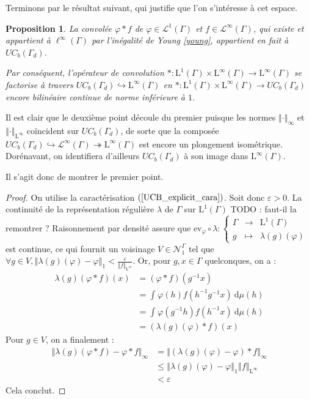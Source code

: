 \documentclass[a4paper,12pt]{article}
\newtheorem{proposition}[theorem]{Proposition}
\newcommand{\ev}{\mathrm{ev}}
\newcommand{\norm}[1]{\left\Vert #1\right\Vert}
\newcommand{\integral}[4]{\int_{#1}^{#2} #3~\mathrm{d}#4}
\newcommand\fundef[3]{#1: \left\{\begin{array}{ccc}#2\\#3\end{array}\right.}
\newcommand{\inv}{^{-1}}
\newcommand{\comp}{\circ}
\newcommand{\nhds}{\mathcal{N}}
\newcommand{\TODO}[1]{{\color{red}TODO :} #1}
\begin{document}
Terminons par le résultat suivant, qui justifie que l'on s'intéresse à cet espace.

\begin{proposition}\label{conv_UCB}
    La convolée $\varphi\ast f$ de $\varphi\in\mathscr{L}^1(\Gamma)$ et $f\in\mathscr{L}^\infty(\Gamma)$, qui existe et appartient à $\ell^\infty(\Gamma)$ par l'inégalité de Young \ref{young},
    appartient en fait à $UC_b(\Gamma_d)$.

    Par conséquent, l'opérateur de convolution $\ast:\mathrm{L}^1(\Gamma)\times\mathrm{L}^\infty(\Gamma)\to\mathrm{L}^\infty(\Gamma)$
    se factorise à travers $UC_b(\Gamma_d)\hookrightarrow\mathrm{L}^\infty(\Gamma)$ en 
    $\ast:\mathrm{L}^1(\Gamma)\times\mathrm{L}^\infty(\Gamma)\to UC_b(\Gamma_d)$ encore bilinéaire continue de norme inférieure à $1$.
\end{proposition}

Il est clair que le deuxième point découle du premier puisque les normes $\norm{\cdot}_\infty$ et $\norm{\cdot}_{\mathrm{L}^\infty}$ coïncident 
sur $UC_b(\Gamma_d)$, de sorte que la composée $UC_b(\Gamma_d)\hookrightarrow\mathscr{L}^\infty(\Gamma)\twoheadrightarrow\mathrm{L}^\infty(\Gamma)$
est encore un plongement isométrique. Dorénavant, on identifiera d'ailleurs $UC_b(\Gamma_d)$ à son image dans $\mathrm{L}^\infty(\Gamma)$.

Il s'agit donc de montrer le premier point.

\begin{proof}
    On utilise la caractérisation $(\ref{UCB_explicit_cara})$. Soit donc $\varepsilon>0$. La continuité de la représentation régulière $\lambda$ de $\Gamma$ sur $\mathrm{L}^1(\Gamma)$ \TODO{faut-il la remontrer ? Raisonnement par densité}
    assure que 
    $\fundef{\ev_\varphi\comp\lambda}{\Gamma&\to&\mathrm{L}^1(\Gamma)}{g&\mapsto&\lambda(g)(\varphi)}$ est continue, ce qui fournit 
    un voisinage $V\in\nhds_1^\Gamma$ tel que $\forall g\in V, \norm{\lambda(g)(\varphi) - \varphi}_1<\frac{\varepsilon}{\norm{f}_{\mathrm{L}^\infty}}$. Or, pour $g, x\in \Gamma$ quelconques, on a :
    \begin{align*}
        \lambda(g)(\varphi\ast f)(x)
            &= (\varphi\ast f)(g\inv x) \\
            &= \integral{}{}{\varphi(h)f(h\inv g\inv x)}{\mu(h)} \\
            &= \integral{}{}{\varphi(g\inv h)f(h\inv x)}{\mu(h)} \\
            &= (\lambda(g)(\varphi)\ast f)(x)
    \end{align*}
    Pour $g\in V$, on a finalement :
    \begin{align*}
        \norm{\lambda(g)(\varphi\ast f) - \varphi\ast f}_\infty 
            &= \norm{(\lambda(g)(\varphi) - \varphi)\ast f}_\infty \\
            &\le \norm{\lambda(g)(\varphi) - \varphi}_1\norm{f}_{\mathrm{L}^\infty} \\
            &< \varepsilon
    \end{align*}
    Cela conclut.
\end{proof}
\end{document}

